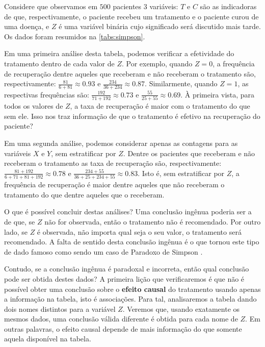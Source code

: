 Considere que observamos em $500$ pacientes $3$ variáveis: 
$T$ e $C$ são as indicadoras de que, respectivamente,
o paciente recebeu um tratamento e o paciente curou de uma doença, e
$Z$ é uma variável binária cujo significado será discutido mais tarde.
Os dados foram resumidos na \cref{tabs:simpson}.

Em uma primeira análise desta tabela, podemos 
verificar a efetividade do tratamento 
dentro de cada valor de $Z$.
Por exemplo, quando $Z=0$,
a frequência de recuperação dentre aqueles que 
receberam e não receberam o tratamento 
são, respectivamente: $\frac{81}{6+81} \approx 0.93$ e
$\frac{234}{36+234} \approx 0.87$.
Similarmente, quando $Z=1$,
as respectivas frequências são:
$\frac{192}{71+192} \approx 0.73$ e
$\frac{55}{25+55} \approx 0.69$.
À primeira vista, para todos os valores de $Z$, a taxa de recuperação 
é maior com o tratamento do que sem ele.
Isso nos traz informação de que 
o tratamento é efetivo na recuperação do paciente?

Em uma segunda análise, podemos considerar
apenas as contagens para as variáveis $X$ e $Y$,
sem estratificar por $Z$.
Dentre os pacientes que receberam e não receberam o tratamento
as taxa de recuperação são, respectivamente:
$\frac{81+192}{6+71+81+192} \approx 0.78$ e
$\frac{234+55}{36+25+234+55} \approx 0.83$. Isto é,
sem estratificar por $Z$, a frequência de recuperação é
maior dentre aqueles que não receberam o tratamento
do que dentre aqueles que o receberam.

O que é possível concluir destas análises?
Uma conclusão ingênua poderia ser a de que,
se $Z$ não for observada, então o tratamento não é recomendado.
Por outro lado, se $Z$ é observada, 
não importa qual seja o seu valor, o tratamento será recomendado.
A falta de sentido desta conclusão ingênua é
o que tornou este tipo de dado famoso como sendo
um caso de Paradoxo de Simpson \citep{Simpson1951}.

Contudo, se a conclusão ingênua é paradoxal e incorreta,
então qual conclusão pode ser obtida destes dados?
A primeira lição que verificaremos é que não é possível obter
uma conclusão sobre o \textbf{efeito causal} do tratamento usando
apenas a informação na tabela, isto é associações.
Para tal, analisaremos a tabela dando 
dois nomes distintos para a variável $Z$.
Veremos que, usando exatamente os mesmos dados,
uma conclusão válida diferente é obtida para cada nome de $Z$.
Em outras palavras, o efeito causal depende de
mais informação do que somente aquela disponível na tabela.

